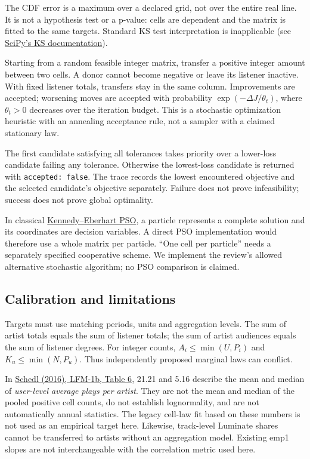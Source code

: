\documentclass[11pt]{article}
\begin{document}
The CDF error is a maximum over a declared grid, not over the entire real
line. It is not a hypothesis test or a p-value: cells are dependent and
the matrix is fitted to the same targets. Standard KS test interpretation
is inapplicable (see \href{https://docs.scipy.org/doc/scipy/reference/generated/scipy.stats.kstest.html}{SciPy's KS documentation}).

Starting from a random feasible integer matrix, transfer a positive integer
amount between two cells. A donor cannot become negative or leave its
listener inactive. With fixed listener totals, transfers stay in the same
column. Improvements are accepted; worsening moves are accepted with
probability $\exp(-\Delta J/\theta_t)$, where $\theta_t>0$ decreases over
the iteration budget. This is a stochastic optimization heuristic with an
annealing acceptance rule, not a sampler with a claimed stationary law.

The first candidate satisfying all tolerances takes priority over a
lower-loss candidate failing any tolerance. Otherwise the lowest-loss
candidate is returned with \texttt{accepted: false}. The trace records the
lowest encountered objective and the selected candidate's objective
separately. Failure does not prove infeasibility; success does not prove
global optimality.

In classical \href{https://staff.washington.edu/paymana/swarm/kennedy95-ijcnn.pdf}{Kennedy--Eberhart PSO}, a particle represents a complete solution and its
coordinates are decision variables. A direct PSO implementation would
therefore use a whole matrix per particle. ``One cell per particle'' needs
a separately specified cooperative scheme. We implement the review's
allowed alternative stochastic algorithm; no PSO comparison is claimed.

\subsection{Calibration and limitations}
Targets must use matching periods, units and aggregation levels.
The sum of artist totals equals the sum of listener totals; the sum of
artist audiences equals the sum of listener degrees. For integer counts,
$A_i\le\min(U,P_i)$ and $K_u\le\min(N,P_u)$.
Thus independently proposed marginal laws can conflict.

In \href{https://www.cp.jku.at/people/schedl/Research/Publications/pdf/schedl_icmr_2016.pdf}{Schedl (2016), LFM-1b, Table 6}, 21.21 and 5.16 describe the mean and median
of \emph{user-level average plays per artist}. They are not the mean and
median of the pooled positive cell counts, do not establish lognormality,
and are not automatically annual statistics. The legacy cell-law fit
based on these numbers is not used as an empirical target here. Likewise,
track-level Luminate shares cannot be transferred to artists without an
aggregation model. Existing emp1 slopes are not interchangeable with the
correlation metric used here.
\end{document}
